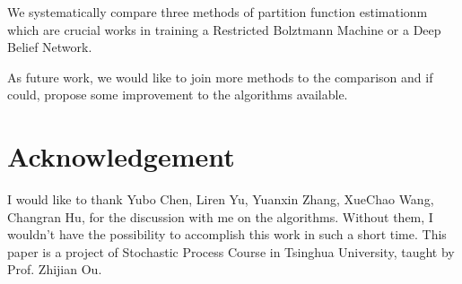 \documentclass{sig-alternate-05-2015}
\begin{document}
We systematically compare three methods of partition function estimationm which are crucial works in training a Restricted Bolztmann Machine or a Deep Belief Network. 

As future work, we would like to join more methods to the comparison and if could, propose some improvement to the algorithms available.


\renewcommand{\baselinestretch}{1.1}
\balance

\small

\section{Acknowledgement} \label{sec:acknowledgement}
I would like to thank Yubo Chen, Liren Yu, Yuanxin Zhang, XueChao Wang, Changran Hu, for the discussion with me on the algorithms. Without them, I wouldn't have the possibility to accomplish this work in such a short time. This paper is a project of Stochastic Process Course in Tsinghua University, taught by Prof. Zhijian Ou.




	
\end{document}
